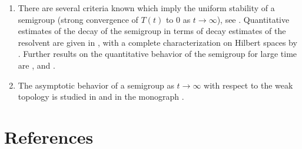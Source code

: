 \begin{enumerate}
\item 
There are several criteria known which imply the uniform stability of a semigroup (\ie  strong convergence of $T(t)$ to $0$ as $t \rightarrow \infty$), see \eg \textcite{zbmath05136549}.
Quantitative estimates of the decay of the semigroup in terms of decay estimates of the resolvent are given in \textcite{zbmath05562661}, with a complete characterization on Hilbert spaces by \textcite{zbmath05700559}. 
Further results on the quantitative behavior of the semigroup for large time are \textcite{zbmath06575587}, \textcite{zbmath08146690} and 
\textcite{zbmath07114750}.


\item
The asymptotic behavior of a semigroup as $t \rightarrow \infty$  with respect to the weak topology is studied in 
\textcite{zbmath05491771} and in the monograph \textcite{zbmath05625330}.

\end{enumerate}
\section*{References}
{\RaggedRight
  \printbibliography[heading=none]
 }